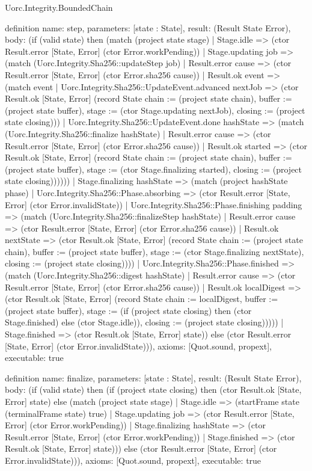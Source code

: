 \begin{lexlean}{Uorc.Integrity.BoundedChain}
\begin{semanticmodule}
definition{
  name: step,
  parameters: [state : State],
  result: (Result State Error),
  body: (if (valid state) then (match (project state stage)
    | Stage.idle => (ctor Result.error [State, Error] (ctor Error.workPending))
    | Stage.updating job => (match (Uorc.Integrity.Sha256::updateStep job)
      | Result.error cause => (ctor Result.error [State, Error] (ctor Error.sha256 cause))
      | Result.ok event => (match event
        | Uorc.Integrity.Sha256::UpdateEvent.advanced nextJob => (ctor Result.ok [State, Error] (record State {chain := (project state chain), buffer := (project state buffer), stage := (ctor Stage.updating nextJob), closing := (project state closing)}))
        | Uorc.Integrity.Sha256::UpdateEvent.done hashState => (match (Uorc.Integrity.Sha256::finalize hashState)
          | Result.error cause => (ctor Result.error [State, Error] (ctor Error.sha256 cause))
          | Result.ok started => (ctor Result.ok [State, Error] (record State {chain := (project state chain), buffer := (project state buffer), stage := (ctor Stage.finalizing started), closing := (project state closing)})))))
    | Stage.finalizing hashState => (match (project hashState phase)
      | Uorc.Integrity.Sha256::Phase.absorbing => (ctor Result.error [State, Error] (ctor Error.invalidState))
      | Uorc.Integrity.Sha256::Phase.finishing padding => (match (Uorc.Integrity.Sha256::finalizeStep hashState)
        | Result.error cause => (ctor Result.error [State, Error] (ctor Error.sha256 cause))
        | Result.ok nextState => (ctor Result.ok [State, Error] (record State {chain := (project state chain), buffer := (project state buffer), stage := (ctor Stage.finalizing nextState), closing := (project state closing)})))
      | Uorc.Integrity.Sha256::Phase.finished => (match (Uorc.Integrity.Sha256::digest hashState)
        | Result.error cause => (ctor Result.error [State, Error] (ctor Error.sha256 cause))
        | Result.ok localDigest => (ctor Result.ok [State, Error] (record State {chain := localDigest, buffer := (project state buffer), stage := (if (project state closing) then (ctor Stage.finished) else (ctor Stage.idle)), closing := (project state closing)}))))
    | Stage.finished => (ctor Result.ok [State, Error] state)) else (ctor Result.error [State, Error] (ctor Error.invalidState))),
  axioms: [Quot.sound, propext],
  executable: true
}

definition{
  name: finalize,
  parameters: [state : State],
  result: (Result State Error),
  body: (if (valid state) then (if (project state closing) then (ctor Result.ok [State, Error] state) else (match (project state stage)
    | Stage.idle => (startFrame state (terminalFrame state) true)
    | Stage.updating job => (ctor Result.error [State, Error] (ctor Error.workPending))
    | Stage.finalizing hashState => (ctor Result.error [State, Error] (ctor Error.workPending))
    | Stage.finished => (ctor Result.ok [State, Error] state))) else (ctor Result.error [State, Error] (ctor Error.invalidState))),
  axioms: [Quot.sound, propext],
  executable: true
}


\end{semanticmodule}
\end{lexlean}

